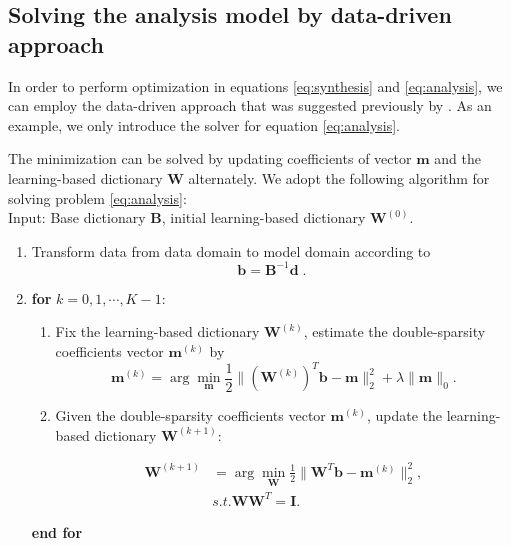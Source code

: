 \subsection{Solving the analysis model by data-driven approach}
In order to perform optimization in equations \ref{eq:synthesis} and \ref{eq:analysis}, we can employ the data-driven approach that was suggested previously by \cite{jianfeng2013}. As an example, we only introduce the solver for equation \ref{eq:analysis}. %

The minimization can be solved by updating coefficients of vector $\mathbf{m}$ and the learning-based dictionary $\mathbf{W}$ alternately. We adopt the following algorithm for solving problem \ref{eq:analysis}:\\
Input: Base dictionary $\mathbf{B}$, initial learning-based dictionary $\mathbf{W}^{(0)}$.
\begin{enumerate}
\item Transform data from data domain to model domain according to
\begin{equation}
\label{eq:ana}
\mathbf{b} = \mathbf{B}^{-1} \mathbf{d}\;.
\end{equation}

\item \textbf{for} $k=0,1,\cdots,K-1$:
\begin{enumerate}
\item
Fix the learning-based dictionary $\mathbf{W}^{(k)}$, estimate the double-sparsity coefficients vector $\mathbf{m}^{(k)}$ by
\begin{equation}
\label{eq:eq7}
\mathbf{m}^{(k)}=\arg\min_{\mathbf{m}} \frac{1}{2}\parallel \left(\mathbf{W}^{(k)}\right)^T \mathbf{b}-\mathbf{m} \parallel_2^2 + \lambda\parallel \mathbf{m} \parallel_0.
\end{equation}

\item Given the double-sparsity coefficients vector $\mathbf{m}^{(k)}$, update the learning-based dictionary $\mathbf{W}^{(k+1)}$:

\begin{equation}
\label{eq:eq8}
\begin{split}
\mathbf{W}^{(k+1)} &= \arg\min_{\mathbf{W}} \frac{1}{2}\parallel \mathbf{W}^T\mathbf{b} - \mathbf{m}^{(k)}\parallel_2^2, \\
&s.t. \mathbf{W}\mathbf{W}^{T} = \mathbf{I}.
\end{split}
\end{equation}
\end{enumerate}
\textbf{end for}
\end{enumerate}
